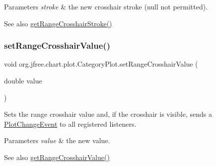 \begin{DoxyParams}{Parameters}
{\em stroke} & the new crosshair stroke ({\ttfamily null} not permitted).\\
\hline
\end{DoxyParams}
\begin{DoxySeeAlso}{See also}
\mbox{\hyperlink{classorg_1_1jfree_1_1chart_1_1plot_1_1_category_plot_ace9c05d0aebbe5a5a97b1c0572c3ac83}{get\+Range\+Crosshair\+Stroke()}} 
\end{DoxySeeAlso}
\mbox{\label{classorg_1_1jfree_1_1chart_1_1plot_1_1_category_plot_af4795fd7065e9245eb43140f5adf7fed}} 
\subsubsection{\texorpdfstring{set\+Range\+Crosshair\+Value()}{setRangeCrosshairValue()}\hspace{0.1cm}{\footnotesize\ttfamily [1/2]}}
{\footnotesize\ttfamily void org.\+jfree.\+chart.\+plot.\+Category\+Plot.\+set\+Range\+Crosshair\+Value (\begin{DoxyParamCaption}\item[{double}]{value }\end{DoxyParamCaption})}

Sets the range crosshair value and, if the crosshair is visible, sends a \mbox{\hyperlink{}{Plot\+Change\+Event}} to all registered listeners.


\begin{DoxyParams}{Parameters}
{\em value} & the new value.\\
\hline
\end{DoxyParams}
\begin{DoxySeeAlso}{See also}
\mbox{\hyperlink{classorg_1_1jfree_1_1chart_1_1plot_1_1_category_plot_a01074b7b04854fda802e06bb5418671b}{get\+Range\+Crosshair\+Value()}} 
\end{DoxySeeAlso}
\mbox{\label{classorg_1_1jfree_1_1chart_1_1plot_1_1_category_plot_a15a4903dc9c5f79a02fb1e41ca30409e}} 
